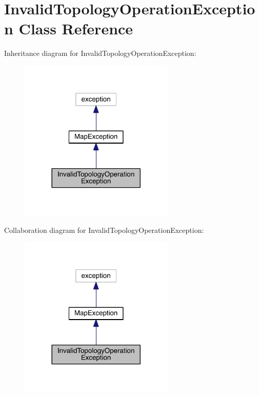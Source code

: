 \hypertarget{class_invalid_topology_operation_exception}{}\section{Invalid\+Topology\+Operation\+Exception Class Reference}
\label{class_invalid_topology_operation_exception}


Inheritance diagram for Invalid\+Topology\+Operation\+Exception\+:
\nopagebreak
\begin{figure}[H]
\begin{center}
\leavevmode
\includegraphics[width=209pt]{class_invalid_topology_operation_exception__inherit__graph}
\end{center}
\end{figure}


Collaboration diagram for Invalid\+Topology\+Operation\+Exception\+:
\nopagebreak
\begin{figure}[H]
\begin{center}
\leavevmode
\includegraphics[width=209pt]{class_invalid_topology_operation_exception__coll__graph}
\end{center}
\end{figure}
